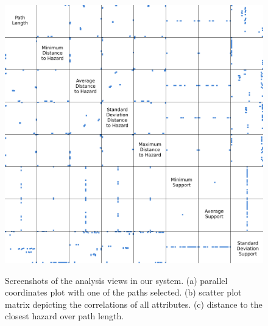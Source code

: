 \begin{figure}
{{	        \includegraphics[width=\mysize]{figures/fig-analysis-scatter.png}
	    }
	    \label{fig:overview:analysis:scatter}
	}
    \caption{Screenshots of the analysis views in our system. (a) parallel coordinates plot with one of the paths selected. (b) scatter plot matrix depicting the correlations of all attributes. (c) distance to the closest hazard over path length.}
\end{figure}

